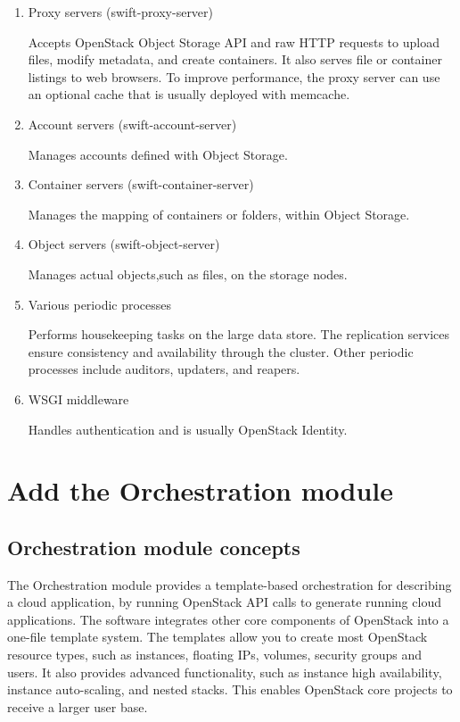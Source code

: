     \begin{enumerate}
        \item Proxy servers (swift-proxy-server)
        \par Accepts OpenStack Object Storage API and raw HTTP requests to upload files, modify metadata, and create containers. It also serves file or container listings to web browsers. To improve performance, the proxy server can use an optional cache that is usually deployed with memcache.
        
        \item Account servers (swift-account-server)
        \par Manages accounts defined with Object Storage.
        
        \item Container servers (swift-container-server)
        \par Manages the mapping of containers or folders, within Object Storage.
        
        \item Object servers (swift-object-server)
        \par Manages actual objects,such as files, on the storage nodes.
        
        \item Various periodic processes
        \par Performs housekeeping tasks on the large data store. The replication services ensure consistency and availability through the cluster. Other periodic processes include auditors, updaters, and reapers.
        
        \item WSGI middleware
        \par Handles authentication and is usually OpenStack Identity.
    \end{enumerate}


\section{Add the Orchestration module}
    \subsection{Orchestration module concepts}

    \par The Orchestration module provides a template-based orchestration for describing a cloud application, by running OpenStack API calls to generate running cloud applications. The software integrates other core components of OpenStack into a one-file template system. The templates allow you to create most OpenStack resource types, such as instances, floating IPs, volumes, security groups and users. It also provides advanced functionality, such as instance high availability, instance auto-scaling, and nested stacks. This enables OpenStack core projects to receive a larger user base.

